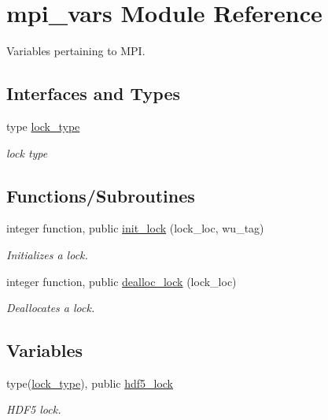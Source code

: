 \hypertarget{namespacempi__vars}{}\section{mpi\+\_\+vars Module Reference}
\label{namespacempi__vars}


Variables pertaining to M\+PI.  


\subsection*{Interfaces and Types}
\begin{DoxyCompactItemize}
\item 
type \hyperlink{structmpi__vars_1_1lock__type}{lock\+\_\+type}
\begin{DoxyCompactList}\small\item\em lock type \end{DoxyCompactList}\end{DoxyCompactItemize}
\subsection*{Functions/\+Subroutines}
\begin{DoxyCompactItemize}
\item 
integer function, public \hyperlink{namespacempi__vars_ab38aeec20e567cf6f272587890ead066}{init\+\_\+lock} (lock\+\_\+loc, wu\+\_\+tag)
\begin{DoxyCompactList}\small\item\em Initializes a lock. \end{DoxyCompactList}\item 
integer function, public \hyperlink{namespacempi__vars_af03c942b5f1c980adf9e1b2ba3f4bd58}{dealloc\+\_\+lock} (lock\+\_\+loc)
\begin{DoxyCompactList}\small\item\em Deallocates a lock. \end{DoxyCompactList}\end{DoxyCompactItemize}
\subsection*{Variables}
\begin{DoxyCompactItemize}
\item 
type(\hyperlink{structmpi__vars_1_1lock__type}{lock\+\_\+type}), public \hyperlink{namespacempi__vars_a834e19cd963fef0ad150e22aa3c56d53}{hdf5\+\_\+lock}
\begin{DoxyCompactList}\small\item\em H\+D\+F5 lock. \end{DoxyCompactList}\end{DoxyCompactItemize}


